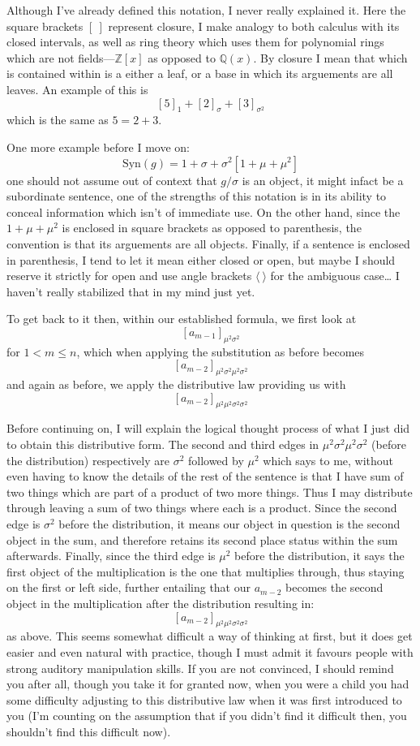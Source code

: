 \documentclass[twoside]{article}
\begin{document}
Although I've already defined this notation, I never really explained it.  Here the square brackets $ [\ ] $ represent
closure, I make analogy to both calculus with its closed intervals, as well as ring theory which uses them for polynomial
rings which are not fields---$ \mathbb{Z}[x] $ as opposed to $ \mathbb{Q}(x) $.  By closure I mean that which is contained
within is a either a leaf, or a base in which its arguements are all leaves.  An example of this is
$$ [5]_{1}+[2]_{\sigma}+[3]_{\sigma^2} $$
which is the same as $ 5=2+3 $.

One more example before I move on:
$$ \mbox{Syn}(g)=1+\sigma+\sigma^2[1+\mu+\mu^2] $$
one should not assume out of context that $ g/\sigma $ is an object, it might infact be a subordinate sentence, one of
the strengths of this notation is in its ability to conceal information which isn't of immediate use.  On the other hand,
since the $ 1+\mu+\mu^2 $ is enclosed in square brackets as opposed to parenthesis, the convention is that its arguements
are all objects.  Finally, if a sentence is enclosed in parenthesis, I tend to let it mean either closed or open, but
maybe I should reserve it strictly for open and use angle brackets $ \langle\ \rangle $ for the ambiguous case\ldots
I haven't really stabilized that in my mind just yet.

To get back to it then, within our established formula, we first look at
$$ [a_{m-1}]_{\mu^2\sigma^2} $$
for $ 1 < m\le n $, which when applying the substitution as before becomes
$$ [a_{m-2}]_{\mu^2\sigma^2\mu^2\sigma^2} $$
and again as before, we apply the distributive law providing us with
$$ [a_{m-2}]_{\mu^2\mu^2\sigma^2\sigma^2} $$

Before continuing on, I will explain the logical thought process of what I just did to obtain this distributive form.
The second and third edges in $ \mu^2\sigma^2\mu^2\sigma^2 $ (before the distribution) respectively are $ \sigma^2 $
followed by $ \mu^2 $ which says to me, without even having to know the details of the rest of the sentence is that I
have sum of two things which are part of a product of two more things.  Thus I may distribute through leaving a sum of
two things where each is a product.  Since the second edge is $ \sigma^2 $ before the distribution, it means our object
in question is the second object in the sum, and therefore retains its second place status within the sum afterwards.
Finally, since the third edge is $ \mu^2 $ before the distribution, it says the first object of the multiplication is
the one that multiplies through, thus staying on the first or left side, further entailing that our $ a_{m-2} $ becomes
the second object in the multiplication after the distribution resulting in:
$$ [a_{m-2}]_{\mu^2\mu^2\sigma^2\sigma^2} $$
as above.  This seems somewhat difficult a way of thinking at first, but it does get easier and even natural with
practice, though I must admit it favours people with strong auditory manipulation skills.  If you are not convinced,
I should remind you after all, though you take it for granted now, when you were a child you had some difficulty
adjusting to this distributive law when it was first introduced to you (I'm counting on the assumption that if you
didn't find it difficult then, you shouldn't find this difficult now).
\end{document}
